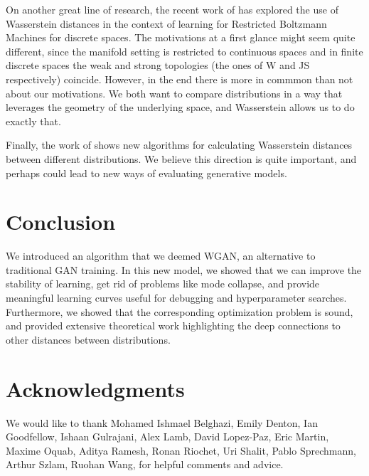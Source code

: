 \documentclass{article} %
\theoremstyle{definition}
\theoremstyle{definition}
\begin{document}
On another great line of research, the recent work of \cite{Mont-ea-WRBM}
has explored the use of Wasserstein distances in the context of learning
for Restricted Boltzmann Machines for discrete spaces. The motivations
at a first glance might seem quite different, since the manifold setting is restricted
to continuous spaces and in finite discrete spaces the weak and strong
topologies (the ones of W and JS respectively) coincide. However, in the
end there is more in commmon than not about our motivations. We both
want to compare distributions in a way that leverages the geometry of the
underlying space, and Wasserstein allows us to do exactly that.

Finally, the work of \cite{Gen-ea-LSOpt} shows new algorithms for calculating
Wasserstein distances between different distributions. We believe this direction
is quite important, and perhaps could lead to new ways of evaluating generative models.

\section{Conclusion}
  We introduced an algorithm that we deemed WGAN, an alternative
to traditional GAN training. In this new model, we showed that we can
improve the stability of learning, get rid of problems like mode collapse,
and provide meaningful learning curves useful for debugging and hyperparameter
searches. Furthermore, we showed that the corresponding optimization problem
is sound, and provided extensive theoretical work highlighting the
deep connections to other distances between distributions.

\section*{Acknowledgments}
We would like to thank
Mohamed Ishmael Belghazi,
Emily Denton,
Ian Goodfellow,
Ishaan Gulrajani,
Alex Lamb,
David Lopez-Paz,
Eric Martin,
Maxime Oquab,
Aditya Ramesh,
Ronan Riochet,
Uri Shalit,
Pablo Sprechmann,
Arthur Szlam,
Ruohan Wang,
for helpful comments and advice.




\clearpage
\end{document}
